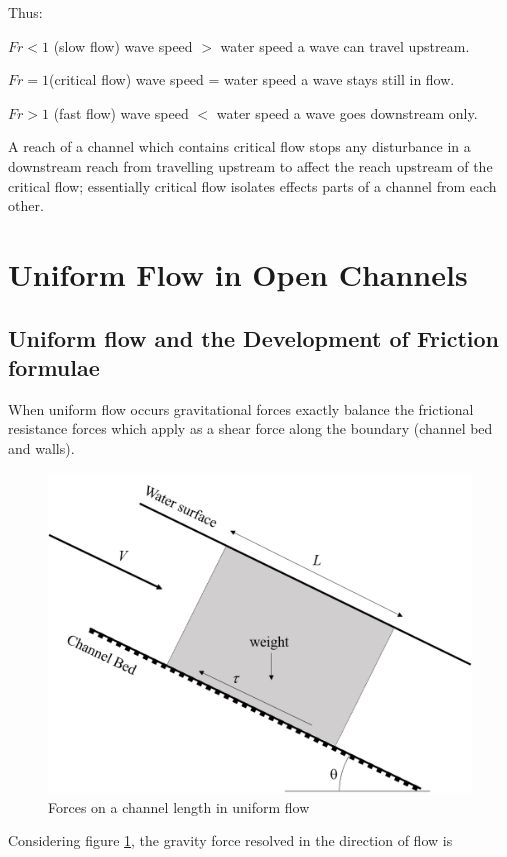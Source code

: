 \documentclass[a4paper, 12pt, british]{article} %
\numberwithin{equation}{section}
\numberwithin{figure}{section}
\numberwithin{table}{section}
\begin{document}
Thus:

$Fr<1$ (slow flow)	wave speed $>$ water speed	a wave can travel upstream.

$Fr=1$(critical flow)	wave speed = water speed	a wave stays still in flow.

$Fr >1$ (fast flow)	wave speed $<$ water speed	a wave goes downstream only.

A reach of a channel which contains critical flow stops any disturbance in a downstream reach from travelling upstream to affect the reach upstream of the critical flow; essentially critical flow isolates effects parts of a channel from each other.

\newpage
\section{Uniform Flow in Open Channels}
\subsection{Uniform flow and the Development of Friction formulae}

When uniform flow occurs gravitational forces exactly balance the frictional resistance forces which apply as a shear force along the boundary (channel bed and walls).

\begin{figure}[H]
	\centering
	\includegraphics[scale=0.5]{./images/uniform_flow_section_2018.png}
	\caption{Forces on a channel length in uniform flow}
	\label{fig:171}
\end{figure} 
Considering figure \ref{fig:171}, the gravity force resolved in the direction of flow is
\end{document}
